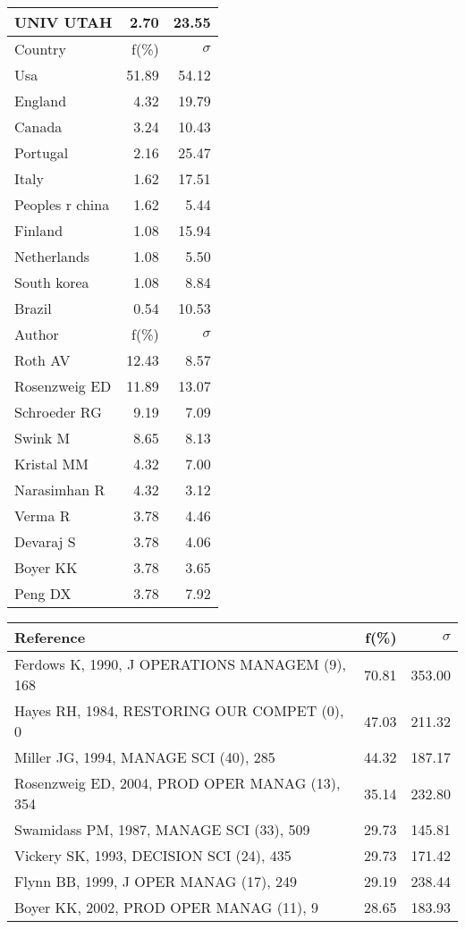 \documentclass[a4paper,11pt]{report}
\begin{document}
\begin{landscape}
\begin{table}[!ht]
{\begin{tabular}{|l r r|}
UNIV UTAH & 2.70 & 23.55\\
\hline
\hline
Country & f(\%) & $\sigma$\\
\hline
Usa & 51.89 & 54.12\\
England & 4.32 & 19.79\\
Canada & 3.24 & 10.43\\
Portugal & 2.16 & 25.47\\
Italy & 1.62 & 17.51\\
Peoples r china & 1.62 & 5.44\\
Finland & 1.08 & 15.94\\
Netherlands & 1.08 & 5.50\\
South korea & 1.08 & 8.84\\
Brazil & 0.54 & 10.53\\
\hline
\hline
Author & f(\%) & $\sigma$\\
\hline
Roth AV & 12.43 & 8.57\\
Rosenzweig ED & 11.89 & 13.07\\
Schroeder RG & 9.19 & 7.09\\
Swink M & 8.65 & 8.13\\
Kristal MM & 4.32 & 7.00\\
Narasimhan R & 4.32 & 3.12\\
Verma R & 3.78 & 4.46\\
Devaraj S & 3.78 & 4.06\\
Boyer KK & 3.78 & 3.65\\
Peng DX & 3.78 & 7.92\\
\hline
\end{tabular}
}
{\scriptsize\begin{tabular}{|l r r|}
\hline
Reference & f(\%) & $\sigma$\\
\hline
Ferdows K, 1990, J OPERATIONS MANAGEM (9), 168 & 70.81 & 353.00\\
Hayes RH, 1984, RESTORING OUR COMPET (0), 0 & 47.03 & 211.32\\
Miller JG, 1994, MANAGE SCI (40), 285 & 44.32 & 187.17\\
Rosenzweig ED, 2004, PROD OPER MANAG (13), 354 & 35.14 & 232.80\\
Swamidass PM, 1987, MANAGE SCI (33), 509 & 29.73 & 145.81\\
Vickery SK, 1993, DECISION SCI (24), 435 & 29.73 & 171.42\\
Flynn BB, 1999, J OPER MANAG (17), 249 & 29.19 & 238.44\\
Boyer KK, 2002, PROD OPER MANAG (11), 9 & 28.65 & 183.93\\

\end{tabular}}
\end{table}
\end{landscape}
\end{document}
